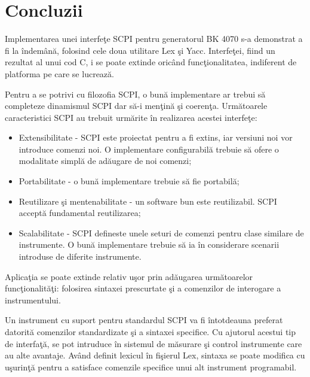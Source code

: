 
\chapter{Concluzii} %
\label{Capitolul5}

Implementarea unei interfe\c{t}e SCPI pentru generatorul BK 4070 s-a demonstrat a fi la \^{i}ndem\^{a}n\u{a}, folosind cele doua utilitare Lex \c{s}i Yacc. Interfe\c{t}ei, fiind un rezultat al unui cod C, i se poate extinde oric\^{a}nd func\c{t}ionalitatea, indiferent de platforma pe care se lucreaz\u{a}.

Pentru a se potrivi cu filozofia SCPI, o bun\u{a} implementare ar trebui s\u{a} completeze dinamismul SCPI dar s\u{a}-i men\c{t}in\u{a} \c{s}i coeren\c{t}a. Urm\u{a}toarele caracteristici SCPI au trebuit urm\u{a}rite \^{i}n realizarea acestei interfe\c{t}e:
\begin{itemize}
	\item Extensibilitate - SCPI este proiectat pentru a fi extins, iar versiuni noi vor introduce comenzi noi. O implementare configurabil\u{a} trebuie s\u{a} ofere o modalitate simpl\u{a} de ad\u{a}ugare de noi comenzi;
	\item Portabilitate - o bun\u{a} implementare trebuie s\u{a} fie portabil\u{a};
	\item Reutilizare \c{s}i mentenabilitate - un software bun este reutilizabil. SCPI accept\u{a} fundamental reutilizarea;
	\item Scalabilitate - SCPI defineste unele seturi de comenzi pentru clase similare de instrumente. O bun\u{a} implementare trebuie s\u{a} ia \^{i}n considerare scenarii introduse de diferite instrumente.
\end{itemize}

Aplica\c{t}ia se poate extinde relativ u\c{s}or prin ad\u{a}ugarea urm\u{a}toarelor func\c{t}ionalit\u{a}\c{t}i: folosirea sintaxei prescurtate \c{s}i a comenzilor de interogare a instrumentului.

Un instrument cu suport pentru standardul SCPI va fi \^{i}ntotdeauna preferat datorit\u{a} comenzilor standardizate \c{s}i a sintaxei specifice. Cu ajutorul acestui tip de interfa\c{t}\u{a}, se pot intruduce \^{i}n sistemul de m\u{a}surare \c{s}i control instrumente care au alte avantaje. Av\^{a}nd definit lexicul \^{i}n fi\c{s}ierul Lex, sintaxa se poate modifica cu u\c{s}urin\c{t}\u{a} pentru a satisface comenzile specifice unui alt instrument programabil. 
